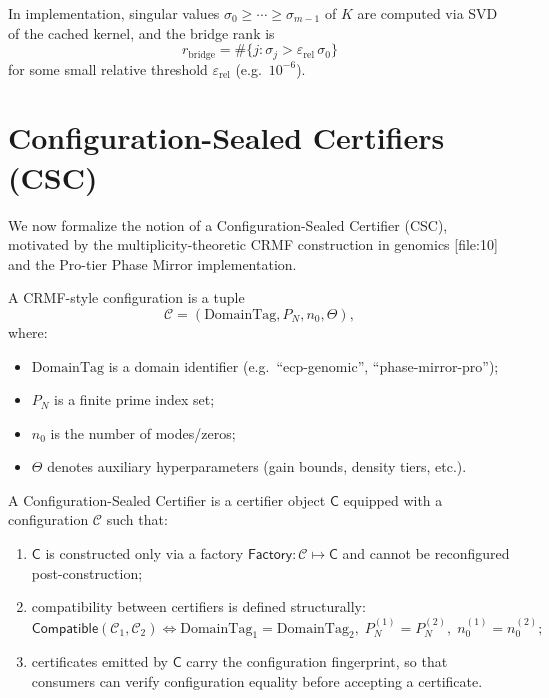 \documentclass[11pt]{article}
\begin{document}
In implementation, singular values $\sigma_0 \ge \cdots \ge \sigma_{m-1}$
of $K$ are computed via SVD of the cached kernel, and the bridge rank is
\[
  r_{\mathrm{bridge}} = \#\{j : \sigma_j > \varepsilon_{\mathrm{rel}}\,\sigma_0\}
\]
for some small relative threshold $\varepsilon_{\mathrm{rel}}$ (e.g.\ $10^{-6}$).

\section{Configuration-Sealed Certifiers (CSC)}

We now formalize the notion of a Configuration-Sealed Certifier (CSC),
motivated by the multiplicity-theoretic CRMF construction in genomics%
[file:10] and the Pro-tier Phase Mirror implementation.

\begin{definition}
A CRMF-style configuration is a tuple
\[
  \mathcal{C} = (\mathrm{DomainTag}, P_N, n_0, \Theta),
\]
where:
\begin{itemize}[leftmargin=*]
  \item $\mathrm{DomainTag}$ is a domain identifier
        (e.g.\ ``ecp-genomic'', ``phase-mirror-pro'');
  \item $P_N$ is a finite prime index set;
  \item $n_0$ is the number of modes/zeros;
  \item $\Theta$ denotes auxiliary hyperparameters (gain bounds, density tiers, etc.).
\end{itemize}
\end{definition}

\begin{definition}
A Configuration-Sealed Certifier is a certifier object $\mathsf{C}$ equipped
with a configuration $\mathcal{C}$ such that:
\begin{enumerate}[label=(\roman*),leftmargin=*]
  \item $\mathsf{C}$ is constructed only via a factory
        $\mathsf{Factory} : \mathcal{C} \mapsto \mathsf{C}$ and cannot
        be reconfigured post-construction;
  \item compatibility between certifiers is defined structurally:
        \[
          \mathsf{Compatible}(\mathcal{C}_1,\mathcal{C}_2)
          \iff
          \mathrm{DomainTag}_1 = \mathrm{DomainTag}_2,\;
          P_N^{(1)} = P_N^{(2)},\;
          n_0^{(1)} = n_0^{(2)};
        \]
  \item certificates emitted by $\mathsf{C}$ carry the configuration
        fingerprint, so that consumers can verify configuration equality
        before accepting a certificate.
\end{enumerate}
\end{definition}
\end{document}
